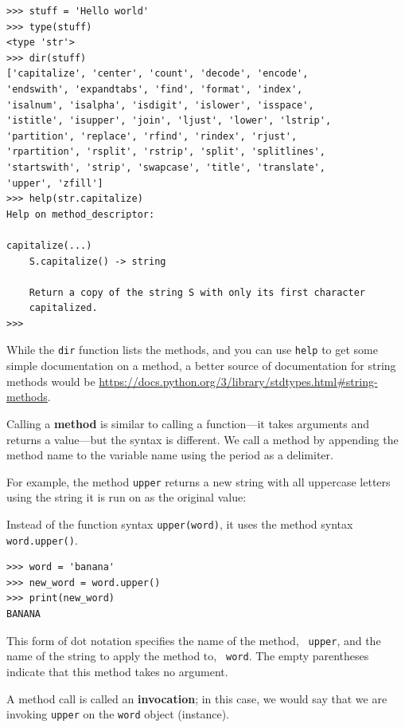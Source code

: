 \beforeverb
\begin{verbatim}
>>> stuff = 'Hello world'
>>> type(stuff)
<type 'str'>
>>> dir(stuff)
['capitalize', 'center', 'count', 'decode', 'encode', 
'endswith', 'expandtabs', 'find', 'format', 'index', 
'isalnum', 'isalpha', 'isdigit', 'islower', 'isspace', 
'istitle', 'isupper', 'join', 'ljust', 'lower', 'lstrip', 
'partition', 'replace', 'rfind', 'rindex', 'rjust', 
'rpartition', 'rsplit', 'rstrip', 'split', 'splitlines', 
'startswith', 'strip', 'swapcase', 'title', 'translate', 
'upper', 'zfill']
>>> help(str.capitalize)
Help on method_descriptor:

capitalize(...)
    S.capitalize() -> string
    
    Return a copy of the string S with only its first character
    capitalized.
>>>
\end{verbatim}
\afterverb
%

While the {\tt dir} function lists the methods, and you 
can use {\tt help} to get some simple documentation on a method, 
a better source of documentation for string methods would be
\url{https://docs.python.org/3/library/stdtypes.html#string-methods}.

Calling a {\bf method} is similar to calling a function---it 
takes arguments and returns a value---but the syntax is different.
We call a method by appending the method name to the variable name
using the period as a delimiter.

For example, the
method {\tt upper} returns a new string with
all uppercase letters using the string it is run on as the original value:


Instead of the function syntax {\tt upper(word)}, it uses
the method syntax {\tt word.upper()}.


\beforeverb
\begin{verbatim}
>>> word = 'banana'
>>> new_word = word.upper()
>>> print(new_word)
BANANA
\end{verbatim}
\afterverb
%
This form of dot notation specifies the name of the method, {\tt
upper}, and the name of the string to apply the method to, {\tt
word}.  The empty parentheses indicate that this method takes no
argument.


A method call is called an {\bf invocation}; in this case, we would
say that we are invoking {\tt upper} on the {\tt word} object (instance).

